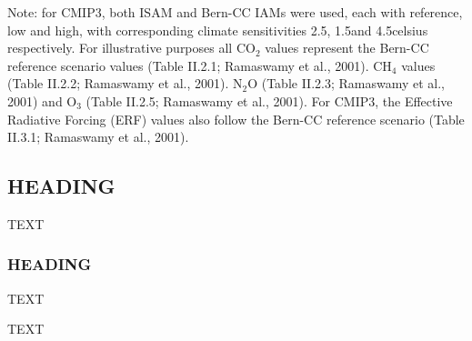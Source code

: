 \documentclass[gmd, preprint]{copernicus}
\newcommand{\mycomment}[1]{}
\begin{document}
\begin{table}[htp]
{} %
\label{tab:tab1-ForcingByMIPsThroughTime}
\footnotesize{Note: for CMIP3, both ISAM and Bern-CC IAMs were used, each with reference, low and high, with corresponding climate sensitivities 2.5\degree, 1.5\degree and 4.5\degree celsius respectively. For illustrative purposes all CO$_{2}$ values represent the Bern-CC reference scenario values (Table II.2.1; Ramaswamy et al., 2001). CH$_{4}$ values (Table II.2.2; Ramaswamy et al., 2001). N$_{2}$O (Table II.2.3; Ramaswamy et al., 2001) and O$_{3}$ (Table II.2.5; Ramaswamy et al., 2001). For CMIP3, the Effective Radiative Forcing (ERF) values also follow the Bern-CC reference scenario (Table II.3.1; Ramaswamy et al., 2001).}
\mycomment{
See ARs
CMIP3
TAR future 2050/2100 radiative forcings Ramaswamy et al., 2001 table 6.14 https://www.ipcc.ch/site/assets/uploads/2018/03/TAR-06.pdf#page=55
TAR abundances and burdens - https://www.ipcc.ch/site/assets/uploads/2018/03/TAR-APPENDICES.pdf#page=21
TAR radiative forcing - https://www.ipcc.ch/site/assets/uploads/2018/03/TAR-APPENDICES.pdf#page=31
CMIP5
Etminan et al 2016 https://doi.org/10.1002/2016GL071930 - Myhre et al 2013, 1998
CMIP6

CMIP3 history lessons (Aug 2003 through Jan 2004)
linked off https://pcmdi.llnl.gov/ipcc/info_for_modeling_groups.html
https://pcmdi.llnl.gov/ipcc/GCMRunsLetterNew_final.pdf
https://pcmdi.llnl.gov/ipcc/solomon_letter_08Dec03.pdf
https://pcmdi.llnl.gov/ipcc/AR4.poll.pdf
}
\end{table}




\subsection{HEADING}
TEXT


\subsubsection{HEADING}
TEXT


\conclusions  %
TEXT


\end{document}
